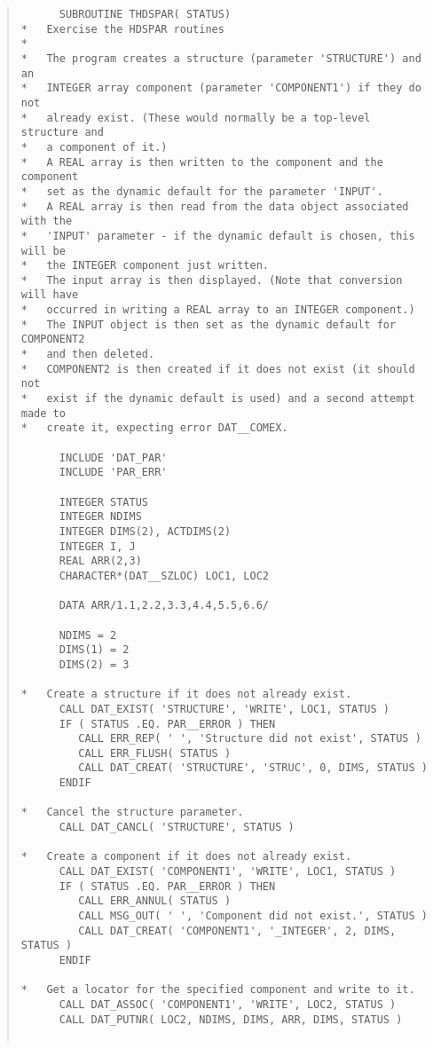 \documentclass[twoside,11pt]{article}
\renewcommand{\_}{\texttt{\symbol{95}}}
\begin{document}
\begin{quote} \begin{verbatim}
      SUBROUTINE THDSPAR( STATUS)
*   Exercise the HDSPAR routines
*
*   The program creates a structure (parameter 'STRUCTURE') and an 
*   INTEGER array component (parameter 'COMPONENT1') if they do not 
*   already exist. (These would normally be a top-level structure and 
*   a component of it.)
*   A REAL array is then written to the component and the component
*   set as the dynamic default for the parameter 'INPUT'.
*   A REAL array is then read from the data object associated with the
*   'INPUT' parameter - if the dynamic default is chosen, this will be
*   the INTEGER component just written.
*   The input array is then displayed. (Note that conversion will have
*   occurred in writing a REAL array to an INTEGER component.)
*   The INPUT object is then set as the dynamic default for COMPONENT2
*   and then deleted.
*   COMPONENT2 is then created if it does not exist (it should not
*   exist if the dynamic default is used) and a second attempt made to
*   create it, expecting error DAT__COMEX.

      INCLUDE 'DAT_PAR'
      INCLUDE 'PAR_ERR'

      INTEGER STATUS
      INTEGER NDIMS
      INTEGER DIMS(2), ACTDIMS(2)
      INTEGER I, J
      REAL ARR(2,3)
      CHARACTER*(DAT__SZLOC) LOC1, LOC2

      DATA ARR/1.1,2.2,3.3,4.4,5.5,6.6/

      NDIMS = 2
      DIMS(1) = 2
      DIMS(2) = 3

*   Create a structure if it does not already exist.
      CALL DAT_EXIST( 'STRUCTURE', 'WRITE', LOC1, STATUS )
      IF ( STATUS .EQ. PAR__ERROR ) THEN
         CALL ERR_REP( ' ', 'Structure did not exist', STATUS )
         CALL ERR_FLUSH( STATUS )
         CALL DAT_CREAT( 'STRUCTURE', 'STRUC', 0, DIMS, STATUS )
      ENDIF

*   Cancel the structure parameter.
      CALL DAT_CANCL( 'STRUCTURE', STATUS )

*   Create a component if it does not already exist.
      CALL DAT_EXIST( 'COMPONENT1', 'WRITE', LOC1, STATUS )
      IF ( STATUS .EQ. PAR__ERROR ) THEN
         CALL ERR_ANNUL( STATUS )
         CALL MSG_OUT( ' ', 'Component did not exist.', STATUS )
         CALL DAT_CREAT( 'COMPONENT1', '_INTEGER', 2, DIMS, STATUS )
      ENDIF

*   Get a locator for the specified component and write to it.
      CALL DAT_ASSOC( 'COMPONENT1', 'WRITE', LOC2, STATUS )
      CALL DAT_PUTNR( LOC2, NDIMS, DIMS, ARR, DIMS, STATUS )
     

\end{verbatim}
\end{quote}
\end{document}
